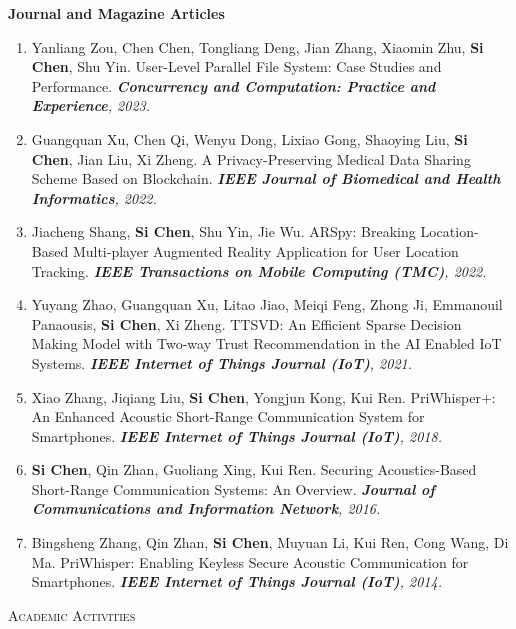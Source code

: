\documentclass[letter]{article}
\newcommand{\heading}[1]{\item \large \textsc{#1} \normalsize}
\newcommand{\publication}[4]{\item #1. #2. \emph{#3.} #4}
\begin{document}
\begin{description}
\textbf{Journal and Magazine Articles}

\begin{enumerate}[{J-}1.]

\publication{Yanliang Zou, Chen Chen, Tongliang Deng, Jian Zhang, Xiaomin Zhu, \textbf{Si Chen}, Shu Yin} {User-Level Parallel File System: Case Studies and Performance}  {\textbf{Concurrency and Computation: Practice and Experience}, 2023}\\

\publication{Guangquan Xu, Chen Qi, Wenyu Dong, Lixiao Gong, Shaoying Liu, \textbf{Si Chen}, Jian Liu, Xi Zheng} {A Privacy-Preserving Medical Data Sharing Scheme Based on Blockchain}  {\textbf{IEEE Journal of Biomedical and Health Informatics}, 2022}\\

\publication{Jiacheng Shang, \textbf{Si Chen}, Shu Yin, Jie Wu} {ARSpy: Breaking Location-Based Multi-player Augmented Reality Application for User Location Tracking}
{\textbf{IEEE Transactions on Mobile Computing (TMC)}, 2022}\\

\publication{Yuyang Zhao, Guangquan Xu, Litao Jiao, Meiqi Feng, Zhong Ji, Emmanouil Panaousis, \textbf{Si Chen}, Xi Zheng} {TTSVD: An Efficient Sparse Decision Making Model with Two-way Trust Recommendation in the AI Enabled IoT Systems}
{\textbf{IEEE Internet of Things Journal (IoT)}, 2021}\\

\publication{Xiao Zhang, Jiqiang Liu, \textbf{Si Chen}, Yongjun Kong, Kui Ren} {PriWhisper+: An Enhanced Acoustic Short-Range Communication System for Smartphones}
{\textbf{IEEE Internet of Things Journal (IoT)}, 2018}\\

\publication{\textbf{Si Chen}, Qin Zhan, Guoliang Xing, Kui Ren} {Securing Acoustics-Based Short-Range Communication Systems: An Overview}
{\textbf{Journal of Communications and Information Network}, 2016}\\

\publication{Bingsheng Zhang, Qin Zhan, \textbf{Si Chen}, Muyuan Li, Kui Ren, Cong Wang, Di Ma} {PriWhisper: Enabling Keyless Secure Acoustic Communication for Smartphones}
{\textbf{IEEE Internet of Things Journal (IoT)}, 2014}\\

\end{enumerate}

\heading{Academic Activities}


\end{description}
\end{document}
